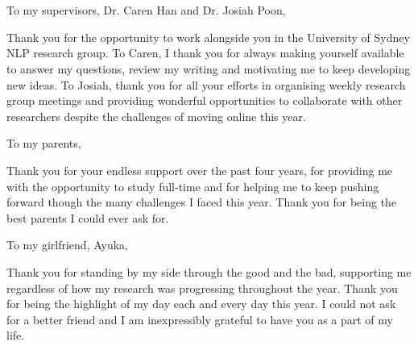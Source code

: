 \chapter*{}

To my supervisors, Dr. Caren Han and Dr. Josiah Poon,

Thank you for the opportunity to work alongside you in the University of Sydney NLP research group. To Caren, I thank you for always making yourself available to answer my questions, review my writing and motivating me to keep developing new ideas. To Josiah, thank you for all your efforts in organising weekly research group meetings and providing wonderful opportunities to collaborate with other researchers despite the challenges of moving online this year.

To my parents,

Thank you for your endless support over the past four years, for providing me with the opportunity to study full-time and for helping me to keep pushing forward though the many challenges I faced this year. Thank you for being the best parents I could ever ask for.

To my girlfriend, Ayuka,

Thank you for standing by my side through the good and the bad, supporting me regardless of how my research was progressing throughout the year. Thank you for being the highlight of my day each and every day this year. I could not ask for a better friend and I am inexpressibly grateful to have you as a part of my life.
